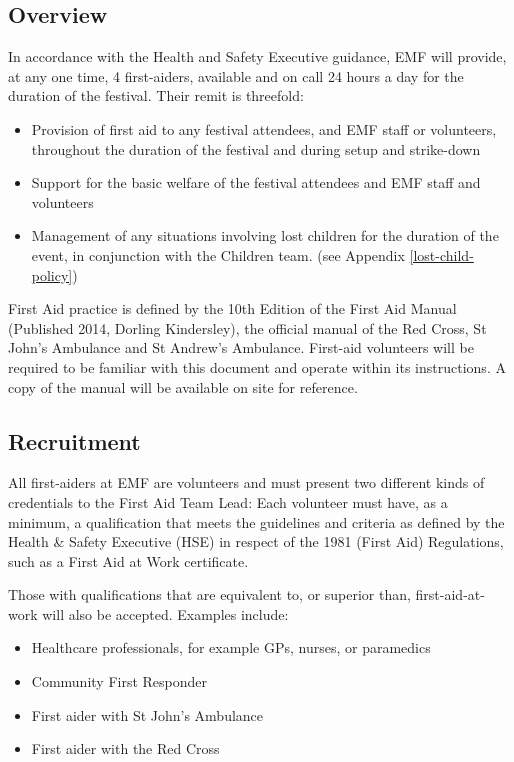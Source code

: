 \subsection{Overview}
In accordance with the Health and Safety Executive guidance, EMF will
provide, at any one time, 4 first-aiders, available and on call 24 hours a day
for the duration of the festival. Their remit is threefold:

\begin{itemize}
  \item Provision of first aid to any festival attendees, and EMF staff or
  volunteers, throughout the duration of the festival and during setup and
  strike-down
  \item Support for the basic welfare of the festival attendees and EMF
  staff and volunteers
  \item Management of any situations involving lost children for the duration of
  the event, in conjunction with the Children team. (see Appendix \ref{lost-child-policy})
\end{itemize}

First Aid practice is defined by the 10th Edition of the First Aid Manual
(Published 2014, Dorling Kindersley), the official manual of the Red Cross, St
John’s Ambulance and St Andrew’s Ambulance. First-aid volunteers will be
required to be familiar with this document and operate within its instructions.
A copy of the manual will be available on site for reference.


\subsection{Recruitment}
All first-aiders at EMF are volunteers and must present two different kinds of
credentials to the First Aid Team Lead: Each volunteer must have, as a minimum,
a qualification that meets the guidelines and criteria as defined by the Health
\& Safety Executive (HSE) in respect of the 1981 (First Aid) Regulations, such
as a First Aid at Work certificate.

Those with qualifications that are equivalent to, or superior than,
first-aid-at-work will also be accepted. Examples include:

\begin{itemize}
  \item Healthcare professionals, for example GPs, nurses, or paramedics
  \item Community First Responder
  \item First aider with St John’s Ambulance
  \item First aider with the Red Cross
\end{itemize}

